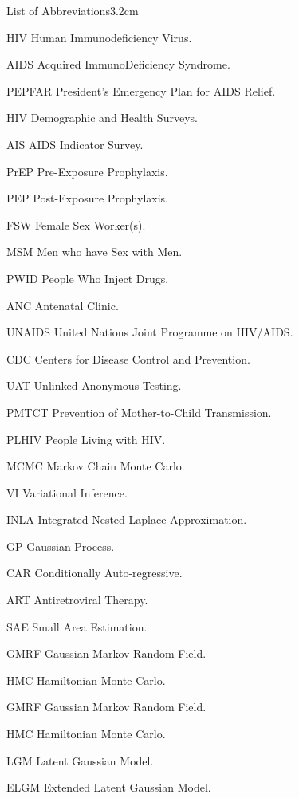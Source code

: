 

\begin{mclistof}{List of Abbreviations}{3.2cm}

\item[HIV] Human Immunodeficiency Virus.
\item[AIDS] Acquired ImmunoDeficiency Syndrome.
\item[PEPFAR] President’s Emergency Plan for AIDS Relief.
\item[HIV] Demographic and Health Surveys.
\item[AIS] AIDS Indicator Survey.
\item[PrEP] Pre-Exposure Prophylaxis.
\item[PEP] Post-Exposure Prophylaxis.
\item[FSW] Female Sex Worker(s).
\item[MSM] Men who have Sex with Men.
\item[PWID] People Who Inject Drugs.
\item[ANC] Antenatal Clinic.
\item[UNAIDS] United Nations Joint Programme on HIV/AIDS.
\item[CDC] Centers for Disease Control and Prevention.
\item[UAT] Unlinked Anonymous Testing.
\item[PMTCT] Prevention of Mother-to-Child Transmission.
\item[PLHIV] People Living with HIV.

\item[MCMC] Markov Chain Monte Carlo.
\item[VI] Variational Inference.
\item[INLA] Integrated Nested Laplace Approximation.
\item[GP] Gaussian Process.
\item[CAR] Conditionally Auto-regressive.
\item[ART] Antiretroviral Therapy.
\item[SAE] Small Area Estimation.
\item[GMRF] Gaussian Markov Random Field.
\item[HMC] Hamiltonian Monte Carlo.
\item[GMRF] Gaussian Markov Random Field.
\item[HMC] Hamiltonian Monte Carlo.
\item[LGM] Latent Gaussian Model.
\item[ELGM] Extended Latent Gaussian Model.

\end{mclistof} 
